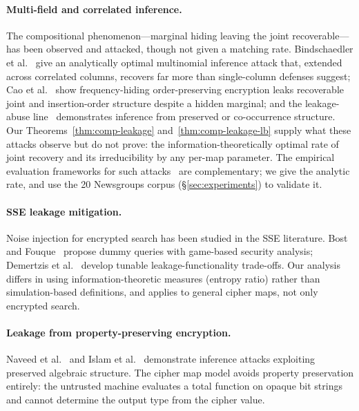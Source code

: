 \documentclass[conference]{IEEEtran}
\theoremstyle{definition}
\theoremstyle{plain}
\theoremstyle{remark}
\begin{document}
\paragraph{Multi-field and correlated inference.}
The compositional phenomenon---marginal hiding leaving the joint
recoverable---has been observed and attacked, though not given a matching
rate.  Bindschaedler et al.~\cite{bindschaedler2018tao} give an
analytically optimal multinomial inference attack that, extended across
correlated columns, recovers far more than single-column defenses suggest;
Cao et al.~\cite{cao2023frequency} show frequency-hiding order-preserving
encryption leaks recoverable joint and insertion-order structure despite a
hidden marginal; and the leakage-abuse line~\cite{cash2015leakage,
naveed2015inference,islam2012access} demonstrates inference from preserved
or co-occurrence structure.  Our Theorems~\ref{thm:comp-leakage}
and~\ref{thm:comp-leakage-lb} supply what these attacks observe but do not
prove: the information-theoretically optimal rate of joint recovery and its
irreducibility by any per-map parameter.  The empirical evaluation
frameworks for such attacks~\cite{kamara2022sok} are complementary; we give
the analytic rate, and use the 20 Newsgroups corpus
(\S\ref{sec:experiments}) to validate it.

\paragraph{SSE leakage mitigation.}
Noise injection for encrypted search has been studied in the SSE
literature.
Bost and Fouque~\cite{bost2017thwarting} propose dummy queries with
game-based security analysis; Demertzis et al.~\cite{demertzis2020seal}
develop tunable leakage-functionality trade-offs.
Our analysis differs in using information-theoretic measures (entropy
ratio) rather than simulation-based definitions, and applies to general
cipher maps, not only encrypted search.

\paragraph{Leakage from property-preserving encryption.}
Naveed et al.~\cite{naveed2015inference} and Islam et
al.~\cite{islam2012access} demonstrate inference attacks exploiting
preserved algebraic structure.
The cipher map model avoids property preservation entirely: the untrusted
machine evaluates a total function on opaque bit strings and cannot
determine the output type from the cipher value.
\end{document}
